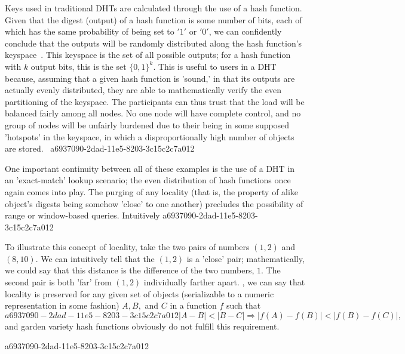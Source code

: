 \documentclass[12pt]{article}
\begin{document}
\par Keys used in traditional DHTs are calculated through the use of a hash function. Given that the digest (output) of a hash function is some number of bits, each of which has the same probability of being set to $'1'$ or $'0'$, we can confidently conclude that the outputs will be randomly distributed along the hash function's keyspace~. This keyspace is the set of all possible outputs; for a hash function with $k$ output bits, this is the set $\{0,1\}^k$. This is useful to users in a DHT because, assuming that a given hash function is 'sound,' in that its outputs are actually evenly distributed, they are able to mathematically verify the even partitioning of the keyspace. The participants can thus trust that the load will be balanced fairly among all nodes. No one node will have complete control, and no group of nodes will be unfairly burdened due to their being in some supposed 'hotspots' in the keyspace, in which a disproportionally high number of objects are stored.~
a6937090-2dad-11e5-8203-3c15c2c7a012
\par One important continuity between all of these examples is the use of a DHT in an 'exact-match' lookup scenario; the even distribution of hash functions once again comes into play. The purging of any locality (that is, the property of alike object's digests being somehow 'close' to one another) precludes the possibility of range or window-based queries. Intuitively
a6937090-2dad-11e5-8203-3c15c2c7a012
\par To illustrate this concept of locality, take the two pairs of numbers $(1,2)$ and $(8,10)$. We can intuitively tell that the $(1,2)$ is a 'close' pair; mathematically, we could say that this distance is the difference of the two numbers, $1$. The second pair is both 'far' from $(1,2)$ individually farther apart. , we can say that locality is preserved for any given set of objects (serializable to a numeric representation in some fashion) $A,B,$ and $C$ in a function $f$ such that
\begin{equation}
a6937090-2dad-11e5-8203-3c15c2c7a012|A-B| < |B-C| \Rightarrow |f(A)-f(B)| < |f(B) - f(C)|,
\end{equation}
and garden variety hash functions obviously do not fulfill this requirement.

a6937090-2dad-11e5-8203-3c15c2c7a012\printbibliography
\end{document}
